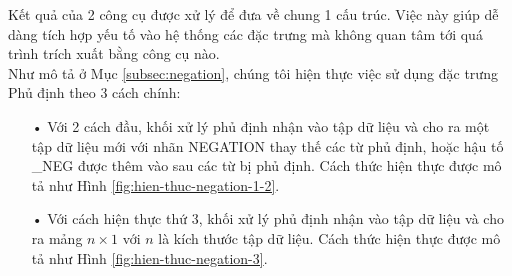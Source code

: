 Kết quả của 2 công cụ được xử lý để đưa về chung 1 cấu trúc. Việc này giúp dễ dàng tích hợp yếu tố vào hệ thống các đặc trưng mà không quan tâm tới quá trình trích xuất bằng công cụ nào.\\

Như mô tả ở Mục \ref{subsec:negation}, chúng tôi hiện thực việc sử dụng đặc trưng Phủ định theo 3 cách chính:
\begin{itemize}
\item[•] Với 2 cách đầu, khối xử lý phủ định nhận vào tập dữ liệu và cho ra một tập dữ liệu mới với nhãn NEGATION thay thế các từ phủ định, hoặc hậu tố \_NEG được thêm vào sau các từ bị phủ định. Cách thức hiện thực được mô tả như Hình \ref{fig:hien-thuc-negation-1-2}.
\item[•] Với cách hiện thực thứ 3, khối xử lý phủ định nhận vào tập dữ liệu và cho ra mảng $n \times 1$ với $n$ là kích thước tập dữ liệu. Cách thức hiện thực được mô tả như Hình \ref{fig:hien-thuc-negation-3}.
\end{itemize}
